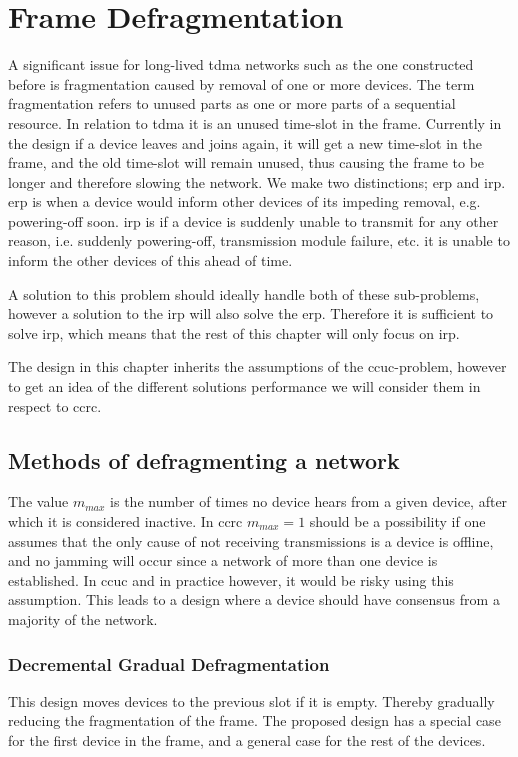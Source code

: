 \section{Frame Defragmentation}
A significant issue for long-lived \gls{tdma} networks such as the one constructed before is fragmentation caused by removal of one or more devices. 
The term fragmentation refers to unused parts as one or more parts of a sequential resource. 
In relation to \gls{tdma} it is an unused time-slot in the frame. 
Currently in the design if a device leaves and joins again, it will get a new time-slot in the frame, and the old time-slot will remain unused, thus causing the frame to be longer and therefore slowing the network.
We make two distinctions; \gls{erp} and \gls{irp}.
\gls{erp} is when a device would inform other devices of its impeding removal, e.g. powering-off soon. 
\gls{irp} is if a device is suddenly unable to transmit for any other reason, i.e. suddenly powering-off, transmission module failure, etc. it is unable to inform the other devices of this ahead of time. 

A solution to this problem should ideally handle both of these sub-problems, however a solution to the \gls{irp} will also solve the \gls{erp}.
Therefore it is sufficient to solve \gls{irp}, which means that the rest of this chapter will only focus on \gls{irp}.  

The design in this chapter inherits the assumptions of the \gls{ccuc}-problem, however to get an idea of the different solutions performance we will consider them in respect to \gls{ccrc}. 

\subsection{Methods of defragmenting a network}

The value $m_{max}$ is the number of times no device hears from a given device, after which it is considered inactive. 
In \gls{ccrc} $m_{max} = 1$ should be a possibility if one assumes that the only cause of not receiving transmissions is a device is offline, and no jamming will occur since a network of more than one device is established.
In \gls{ccuc} and in practice however, it would be risky using this assumption.
This leads to a design where a device should have consensus from a majority of the network.

\subsubsection{Decremental Gradual Defragmentation}
This design moves devices to the previous slot if it is empty. 
Thereby gradually reducing the fragmentation of the frame.
The proposed design has a special case for the first device in the frame, and a general case for the rest of the devices.

